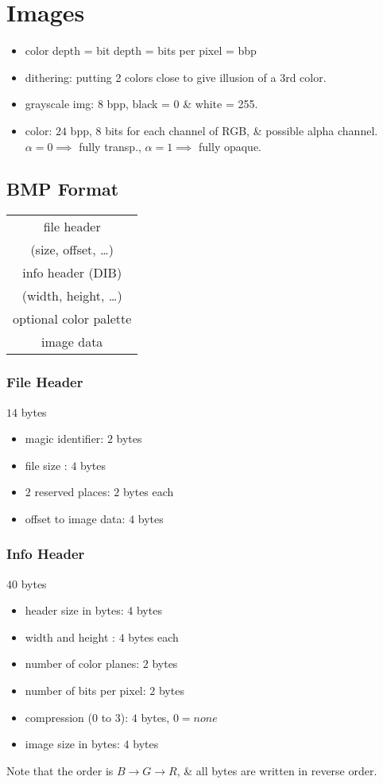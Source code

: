 \section{Images}
\begin{itemize}
  \item color depth = bit depth = bits per pixel = bbp
  \item dithering: putting 2 colors close to give illusion of a 3rd color.
  \item grayscale img: $8$ bpp, black = 0 \& white = 255.
  \item color: $24$ bpp, $8$ bits for each channel of RGB, \& possible alpha channel. $\alpha = 0 \implies$ fully transp., $\alpha = 1 \implies$ fully opaque.
\end{itemize}
\subsection{BMP Format}
\begin{tabular}{|c|}
  \hline
  file header\\
  (size, offset, \dots)\\
  \hline
  info header (DIB)\\
  (width, height, \dots)\\
  \hline
  optional color palette\\
  \hline
  image data\\
  \hline
\end{tabular}
\subsubsection{File Header}
$14$ bytes
\begin{itemize}
  \item magic identifier: $2$ bytes
  \item file size : $4$ bytes
  \item $2$ reserved places: $2$ bytes each
  \item offset to image data: $4$ bytes
\end{itemize}
\subsubsection{Info Header}
$40$ bytes
\begin{itemize}
  \item header size in bytes: $4$ bytes
  \item width and height : $4$ bytes each
  \item number of color planes: $2$ bytes
  \item number of bits per pixel: $2$ bytes
  \item compression (0 to 3): $4$ bytes, $0 = none$
  \item image size in bytes: $4$ bytes
\end{itemize}
{\color{red} Note that the order is $B \rightarrow G \rightarrow R$, \& all bytes are written in reverse order.}
